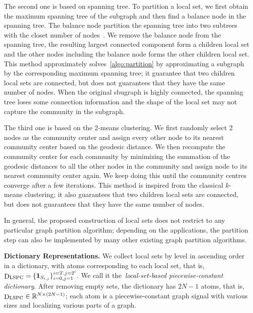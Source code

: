 \documentclass[journal,twocolumn,10pt]{IEEEtran}
\theoremstyle{definition}
\newcommand{\mypar}[1]{{\bf #1.}}
\newcommand{\R}{\ensuremath{\mathbb{R}}}
\DeclareMathOperator{\D}{D}
\begin{document}
The second one is based on spanning tree. To partition a local set, we first obtain the maximum spanning tree of the subgraph and then find a balance node in the spanning tree. The balance node partition the spanning tree into two subtrees with the closet number of nodes~\cite{SharpnackKS:13}. We remove the balance node from the spanning tree, the resulting largest connected component form a children local set and the other nodes including the balance node forms the other children local set. This method approximately solves~\ref{algo:partition} by approximating a subgraph by the corresponding maximum spanning tree; it guarantee that two children local sets are connected, but does not guarantees that they have the same number of nodes. When the original sbugraph is highly connected, the spanning tree loses some connection information and the shape of the local set may not capture the community in the subgraph.

The third one is based on the 2-means clustering. We first randomly select 2 nodes as the community center and assign every other node to its nearest community center based on the geodesic distance. We then recompute the community center for each community by minimizing the summation of the geodesic distances to all the other nodes in the community and assign node to its nearest community center again. We keep doing this until the community centres converge after a few iterations. This method is inspired from the classical $k$-means clustering; it also guarantees that two children local sets are connected, but does not guarantees that they have the same number of nodes. 


In general, the proposed construction of local sets does not restrict to any particular graph partition algorithm; depending on the applications, the partition step can also be implemented by many other existing graph partition algorithms.


\mypar{Dictionary Representations}
We collect local sets by level in
ascending order in a dictionary, with atoms corresponding to each
local set, that is, $ \D_{\rm LSPC} = \{ {\bf 1}_{S_{i, j}} \}_{i=0, j = 1}^{i=T, j = 2^i}$.
We call it the~\emph{local-set-based piecewise-constant dictionary}.
After removing empty sets, the dictionary has $2N-1$ atoms, that is,
$\D_{\rm LSPC} \in \R^{N \times (2N-1)}$; each atom is a
piecewise-constant graph signal with various sizes and localizing
various parts of a graph.  
\end{document}
